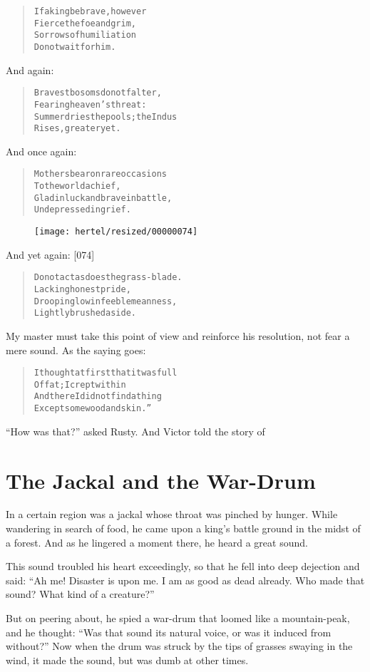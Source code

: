 \documentclass[article, twoside, 10pt]{memoir}
\renewenvironment{verbatim}{%
\begin{quote}%
\vskip -10pt%
\begin{alltt}\normalfont\small}{\end{alltt}%
\end{quote}%
\vskip -10pt
} %
\begin{document}
\begin{verbatim}
If a king be brave, however
    Fierce the foe and grim,
Sorrows of humiliation
    Do not wait for him.
\end{verbatim}
And again:

\begin{verbatim}
Bravest bosoms do not falter,
    Fearing heaven's threat:
Summer dries the pools; the Indus
    Rises, greater yet.
\end{verbatim}
And once again:

\begin{verbatim}
Mothers bear on rare occasions
    To the world a chief,
Glad in luck and brave in battle,
    Undepressed in grief.
\end{verbatim}
\begin{figure}[p]\texttt{[image: hertel/resized/00000074]}\end{figure}And yet again: [074]

\begin{verbatim}
Do not act as does the grass-blade.
    Lacking honest pride,
Drooping low in feeble meanness,
    Lightly brushed aside.
\end{verbatim}
My master must take this point of view and reinforce his
resolution, not fear a mere sound. As the saying goes:

\begin{verbatim}
I thought at first that it was full
    Of fat; I crept within
And there I did not find a thing
    Except some wood and skin.”
\end{verbatim}
``How was that?'' asked Rusty. And Victor told the story of

\chapter{The Jackal and the War-Drum}

In a certain region was a jackal whose throat was pinched by
hunger. While wandering in search of food, he came upon a king's
battle ground in the midst of a forest. And as he lingered a moment
there, he heard a great sound.

This sound troubled his heart exceedingly, so that he fell into
deep dejection and said:
``Ah me! Disaster is upon me. I am as good as dead already. Who made that sound? What kind of a creature?''

But on peering about, he spied a war-drum that loomed like a
mountain-peak, and he thought:
``Was that sound its natural voice, or was it induced from without?''
Now when the drum was struck by the tips of grasses swaying in the
wind, it made the sound, but was dumb at other times.
\end{document}
